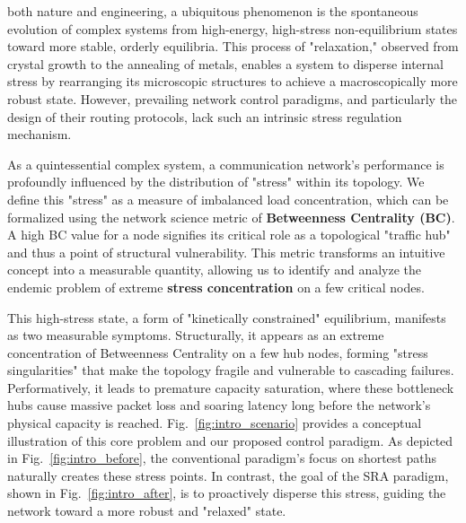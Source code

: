 \documentclass[journal]{IEEEtran}
\begin{document}
 both nature and engineering, a ubiquitous phenomenon is the spontaneous evolution of complex systems from high-energy, high-stress non-equilibrium states toward more stable, orderly equilibria. This process of "relaxation," observed from crystal growth to the annealing of metals, enables a system to disperse internal stress by rearranging its microscopic structures to achieve a macroscopically more robust state. However, prevailing network control paradigms, and particularly the design of their routing protocols, lack such an intrinsic stress regulation mechanism.

As a quintessential complex system, a communication network's performance is profoundly influenced by the distribution of "stress" within its topology. We define this "stress" as a measure of imbalanced load concentration, which can be formalized using the network science metric of \textbf{Betweenness Centrality (BC)}. A high BC value for a node signifies its critical role as a topological "traffic hub" and thus a point of structural vulnerability. This metric transforms an intuitive concept into a measurable quantity, allowing us to identify and analyze the endemic problem of extreme \textbf{stress concentration} on a few critical nodes.

This high-stress state, a form of "kinetically constrained" equilibrium, manifests as two measurable symptoms. Structurally, it appears as an extreme concentration of Betweenness Centrality on a few hub nodes, forming "stress singularities" that make the topology fragile and vulnerable to cascading failures. Performatively, it leads to premature capacity saturation, where these bottleneck hubs cause massive packet loss and soaring latency long before the network's physical capacity is reached. Fig.~\ref{fig:intro_scenario} provides a conceptual illustration of this core problem and our proposed control paradigm. As depicted in Fig.~\ref{fig:intro_before}, the conventional paradigm's focus on shortest paths naturally creates these stress points. In contrast, the goal of the SRA paradigm, shown in Fig.~\ref{fig:intro_after}, is to proactively disperse this stress, guiding the network toward a more robust and "relaxed" state.
\end{document}
